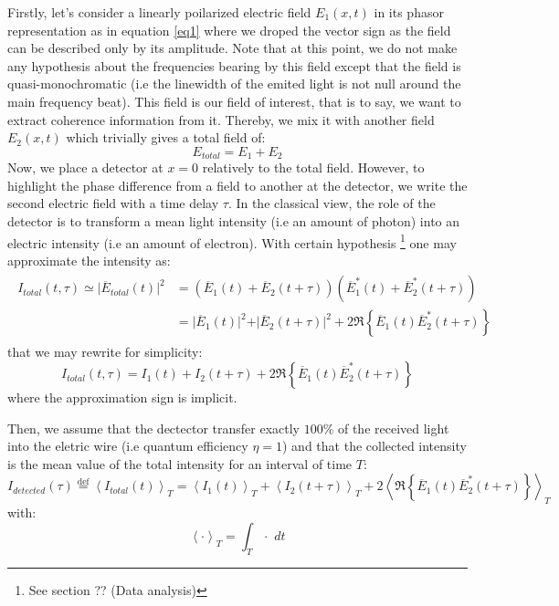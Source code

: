 \documentclass[11pt]{report}
\begin{document}
Firstly, let's consider a linearly poilarized electric field $E_1(x, t)$ in its phasor representation as in equation \eqref{eq1} where we droped the vector sign as the field can be described only by its amplitude. Note that at this point, we do not make any hypothesis about the frequencies bearing by this field except that the field is quasi-monochromatic (i.e the linewidth of the emited light is not null around the main frequency beat). This field is our field of interest, that is to say, we want to extract coherence information from it. Thereby, we mix it with another field $E_2(x, t)$ which trivially gives a total field of:
\begin{equation}
\label{e_tot_def}
E_{total} = E_1 + E_2
\end{equation}
Now, we place a detector at $x=0$ relatively to the total field. However, to highlight the phase difference from a field to another at the detector, we write the second electric field with a time delay $\tau$. In the classical view, the role of the detector is to transform a mean light intensity (i.e an amount of photon) into an electric intensity (i.e an amount of electron). With certain hypothesis \footnote{See section ?? (Data analysis)} one may approximate the intensity as:
\begin{align}
\begin{split}
I_{total}(t, \tau) \simeq \vert\overline{E}_{total}(t)\vert^2 &= (\overline{E}_1(t) + \overline{E}_2(t + \tau))(\overline{E}_1^*(t) + \overline{E}_2^*(t + \tau))\\
&= \vert \overline{E}_1(t) \vert^2 + \vert \overline{E}_2(t + \tau) \vert^2 + 2\Re\left\lbrace \overline{E}_1(t)\overline{E}_2^*(t + \tau)\right\rbrace
\end{split}
\end{align}
that we may rewrite for simplicity:
\begin{equation}
I_{total}(t, \tau) = I_1(t) + I_2(t + \tau) + 2\Re\left\lbrace \overline{E}_1(t) \overline{E}_2^*(t + \tau)\right\rbrace
\end{equation}
where the approximation sign is implicit.

Then, we assume that the dectector transfer exactly $100\% $ of the received light into the eletric wire (i.e quantum efficiency $\eta = 1$) and that the collected intensity is the mean value of the total intensity for an interval of time $T$:
\begin{equation}
I_{detected}(\tau) \stackrel{\text{def}}{=} \left\langle I_{total}(t) \right\rangle_T = \left\langle I_1(t) \right\rangle_T + \left\langle I_2(t + \tau) \right\rangle _T + 2\left\langle \Re\left\lbrace \overline{E}_1(t) \overline{E}_2^*(t + \tau)\right\rbrace \right\rangle _T
\end{equation}
with:
\begin{equation}
\left\langle \cdot \right\rangle _T = \int_T \cdot \,\,dt
\end{equation}
\end{document}
